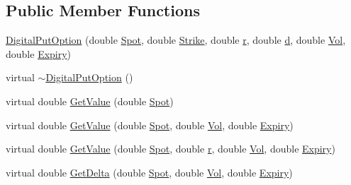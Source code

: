 \subsection*{Public Member Functions}
\begin{DoxyCompactItemize}
\item 
\hyperlink{classMyOption_1_1DigitalPutOption_a06d1c6c093b1bf2a1fcc24e46be8f06f}{Digital\+Put\+Option} (double \hyperlink{classMyOption_1_1Option_a6c6f01d75cde7e92d16a6d8d6f331a1d}{Spot}, double \hyperlink{classMyOption_1_1Option_a3033c483588ce26b175280c7f9dee8d1}{Strike}, double \hyperlink{classMyOption_1_1Option_aa8cb250427dece65ea49255d4102cc8d}{r}, double \hyperlink{classMyOption_1_1Option_a500979f4b32262594d895c4a83b58d1d}{d}, double \hyperlink{classMyOption_1_1Option_a5d6002c14b335c782873bf1437113513}{Vol}, double \hyperlink{classMyOption_1_1Option_ac1adacb417fede41d151b9cda05bcb3d}{Expiry})
\item 
virtual \hyperlink{classMyOption_1_1DigitalPutOption_af373736d79c052e94761072593e37648}{$\sim$\+Digital\+Put\+Option} ()
\item 
virtual double \hyperlink{classMyOption_1_1DigitalPutOption_a4f51d8bdbdddfbebf428cea500c5edf0}{Get\+Value} (double \hyperlink{classMyOption_1_1Option_a6c6f01d75cde7e92d16a6d8d6f331a1d}{Spot})
\item 
virtual double \hyperlink{classMyOption_1_1DigitalPutOption_a3d26c1e53753a199a35f0769672e94cf}{Get\+Value} (double \hyperlink{classMyOption_1_1Option_a6c6f01d75cde7e92d16a6d8d6f331a1d}{Spot}, double \hyperlink{classMyOption_1_1Option_a5d6002c14b335c782873bf1437113513}{Vol}, double \hyperlink{classMyOption_1_1Option_ac1adacb417fede41d151b9cda05bcb3d}{Expiry})
\item 
virtual double \hyperlink{classMyOption_1_1DigitalPutOption_ab55e215fef7a85bb06175a05548a3f77}{Get\+Value} (double \hyperlink{classMyOption_1_1Option_a6c6f01d75cde7e92d16a6d8d6f331a1d}{Spot}, double \hyperlink{classMyOption_1_1Option_aa8cb250427dece65ea49255d4102cc8d}{r}, double \hyperlink{classMyOption_1_1Option_a5d6002c14b335c782873bf1437113513}{Vol}, double \hyperlink{classMyOption_1_1Option_ac1adacb417fede41d151b9cda05bcb3d}{Expiry})
\item 
virtual double \hyperlink{classMyOption_1_1DigitalPutOption_a20e33b1b8a221ea2200fd08f3c691c4a}{Get\+Delta} (double \hyperlink{classMyOption_1_1Option_a6c6f01d75cde7e92d16a6d8d6f331a1d}{Spot}, double \hyperlink{classMyOption_1_1Option_a5d6002c14b335c782873bf1437113513}{Vol}, double \hyperlink{classMyOption_1_1Option_ac1adacb417fede41d151b9cda05bcb3d}{Expiry})

\end{DoxyCompactItemize}
